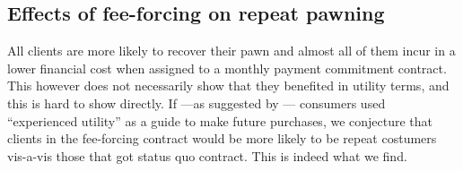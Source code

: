 \documentclass[oneside,11pt]{article}
\begin{document}

\subsection{Effects of fee-forcing on repeat pawning}

All clients are more likely to recover their pawn and almost all of them incur in a lower financial cost when assigned to a monthly payment commitment contract. This however does not necessarily show that they benefited in utility terms, and this is hard to show directly. If ---as suggested by \cite{Laibson2018}--- consumers used ``experienced utility'' as a guide to make future purchases, we conjecture that clients in the fee-forcing contract would be more likely to be repeat costumers vis-a-vis those that got status quo contract. This is indeed what we find. 
\end{document}
